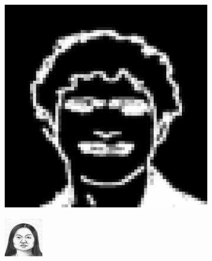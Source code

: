 \documentclass{IEEEcsmag}
\begin{document}
\begin{figure}[ht]
\begin{subfigure}{0.12\textwidth}
    \end{subfigure}
    \begin{subfigure}{0.12\textwidth}
        \includegraphics[width=\linewidth]{images/CelebA/1/distorted_5.png}
    \end{subfigure}
    \begin{subfigure}{0.12\textwidth}
        \includegraphics[width=\linewidth]{CUHK_Student/draws_resized/f1-001-01-sz1.jpg}

\end{subfigure}
\end{figure}
\end{document}

